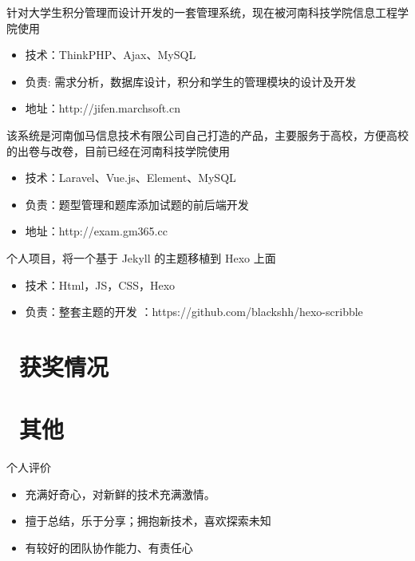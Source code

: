 \documentclass{resume}
\begin{document}
针对大学生积分管理而设计开发的一套管理系统，现在被河南科技学院信息工程学院使用
\begin{itemize}
  \item 技术：ThinkPHP、Ajax、MySQL 
  \item 负责: 需求分析，数据库设计，积分和学生的管理模块的设计及开发
  \item 地址：http://jifen.marchsoft.cn
\end{itemize}

该系统是河南伽马信息技术有限公司自己打造的产品，主要服务于高校，方便高校的出卷与改卷，目前已经在河南科技学院使用
\begin{itemize}
  \item 技术：Laravel、Vue.js、Element、MySQL
  \item 负责：题型管理和题库添加试题的前后端开发
  \item 地址：http://exam.gm365.cc
\end{itemize}

个人项目，将一个基于 Jekyll 的主题移植到 Hexo 上面
\begin{itemize}
  \item 技术：Html，JS，CSS，Hexo
  \item 负责：整套主题的开发
  ：https://github.com/blackshh/hexo-scribble
\end{itemize}

\section{\faHeartO\ 获奖情况}


\section{\faInfo\ 其他}
个人评价
\begin{itemize}[parsep=0.5ex]
  \item 充满好奇心，对新鲜的技术充满激情。
  \item 擅于总结，乐于分享；拥抱新技术，喜欢探索未知
  \item 有较好的团队协作能力、有责任心
\end{itemize}
\end{document}
